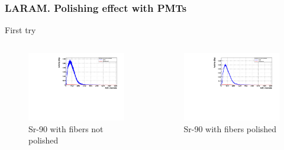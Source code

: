 \documentclass{beamer}
\begin{document}
\begin{frame}
\frametitle{LARAM. Polishing effect with PMTs}
First try

\begin{columns}

\begin{figure}[hbtp]
\centering
\includegraphics[scale=0.3]{LARAM/Polishing_effect/First_try/No_polished/Sr_90_background.pdf}
\caption{Sr-90 with fibers not polished}
\end{figure}


\begin{figure}[hbtp]
\centering
\includegraphics[scale=0.3]{LARAM/Polishing_effect/First_try/Polished/Sr_90_background.pdf}
\caption{Sr-90 with fibers polished}
\end{figure}

\end{columns}

\end{frame}
\end{document}
